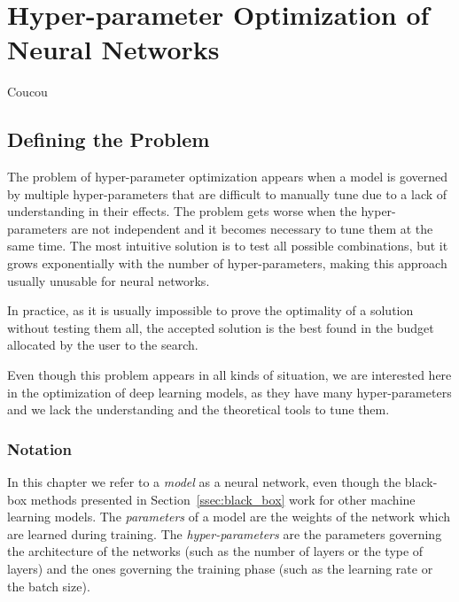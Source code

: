 \chapter{Hyper-parameter Optimization of Neural Networks}
\label{chap:hyperopt}

\begin{chapabstract}
 Coucou
\end{chapabstract}

\minitoc

\newpage

\section{Defining the Problem}

The problem of hyper-parameter optimization appears when a model is governed by multiple hyper-parameters that are difficult to manually tune due to a lack of understanding in their effects. The problem gets worse when the hyper-parameters are not independent and it becomes necessary to tune them at the same time. The most intuitive solution is to test all possible combinations, but it grows exponentially with the number of hyper-parameters, making this approach usually unusable for neural networks.

In practice, as it is usually impossible to prove the optimality of a solution without testing them all, the accepted solution is the best found in the budget allocated by the user to the search.

Even though this problem appears in all kinds of situation, we are interested here in the optimization of deep learning models, as they have many hyper-parameters and we lack the understanding and the theoretical tools to tune them.

\subsection{Notation}
\label{ssec:notation}

In this chapter we refer to a \textit{model} as a neural network, even though the black-box methods presented in Section~\ref{ssec:black_box} work for other machine learning models. The \textit{parameters} of a model are the weights of the network which are learned during training. The \textit{hyper-parameters} are the parameters governing the architecture of the networks (such as the number of layers or the type of layers) and the ones governing the training phase (such as the learning rate or the batch size). 

